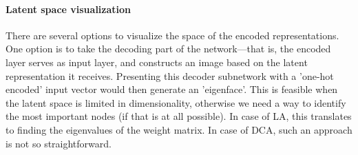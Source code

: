 \paragraph{Latent space visualization} There are several options to visualize the space of the encoded representations. One option is to take the decoding part of the network---that is, the encoded layer serves as input layer, and constructs an image based on the latent representation it receives. Presenting this decoder subnetwork with a 'one-hot encoded' input vector would then generate an 'eigenface'. This is feasible when the latent space is limited in dimensionality, otherwise we need a way to identify the most important nodes (if that is at all possible). In case of LA, this translates to finding the eigenvalues of the weight matrix. In case of DCA, such an approach is not so straightforward. 
